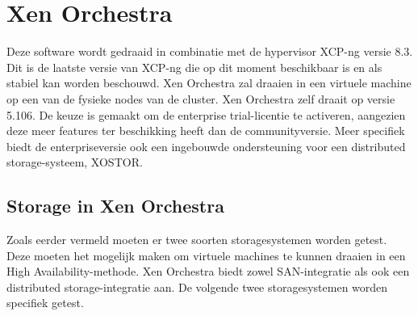



\section{Xen Orchestra}%
Deze software wordt gedraaid in combinatie met de hypervisor XCP-ng versie 8.3. Dit is de laatste versie van XCP-ng die op dit moment beschikbaar is en als stabiel kan worden beschouwd.  
Xen Orchestra zal draaien in een virtuele machine op een van de fysieke nodes van de cluster. Xen Orchestra zelf draait op versie 5.106.  
De keuze is gemaakt om de enterprise trial-licentie te activeren, aangezien deze meer features ter beschikking heeft dan de communityversie. Meer specifiek biedt de enterpriseversie ook een ingebouwde ondersteuning voor een distributed storage-systeem, XOSTOR.

\subsection{Storage in Xen Orchestra}%
Zoals eerder vermeld moeten er twee soorten storagesystemen worden getest. Deze moeten het mogelijk maken om virtuele machines te kunnen draaien in een High Availability-methode.  
Xen Orchestra biedt zowel SAN-integratie als ook een distributed storage-integratie aan.  
De volgende twee storagesystemen worden specifiek getest.

